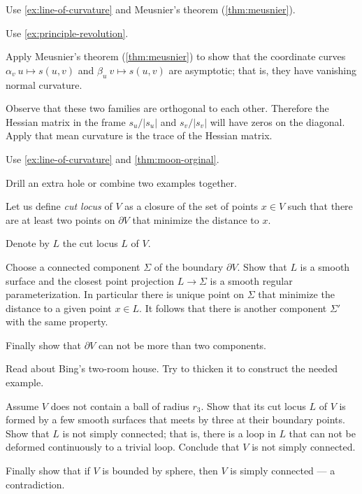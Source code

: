 Use \ref{ex:line-of-curvature} and Meusnier's theorem (\ref{thm:meusnier}).

 Use \ref{ex:principle-revolution}.

 Apply Meusnier's theorem (\ref{thm:meusnier}) to show that the coordinate curves $\alpha_v\:u\mapsto s(u,v)$ and $\beta_u\:v\mapsto s(u,v)$ are asymptotic; that is, they have vanishing normal curvature.

{\sloppy

Observe that these two families are orthogonal to each other.
Therefore the Hessian matrix in the frame $s_u/|s_u|$ and $s_v/|s_v|$ will have zeros on the diagonal.
Apply that mean curvature is the trace of the Hessian matrix.

}

 Use \ref{ex:line-of-curvature} and \ref{thm:moon-orginal}.

 Drill an extra hole or combine two examples together.

Let us define \emph{cut locus} of $V$ as a closure of the set of points $x\in V$ such that there are at least two points on $\partial V$ that minimize the distance to $x$.

Denote by $L$ the cut locus $L$ of $V$.

Choose a connected component $\Sigma$ of the boundary $\partial V$.
Show that $L$ is a smooth surface and the closest point projection $L\to \Sigma$ is a smooth regular parameterization.
In particular there is unique point on $\Sigma$ that minimize the distance to a given point $x\in L$.
It follows that there is another component $\Sigma'$ with the same property.

Finally show that $\partial V$ can not be more than two components.

Read about Bing's two-room house.
Try to thicken it to construct the needed example.

Assume $V$ does not contain a ball of radius $r_3$.
Show that its cut locus $L$ of $V$ is formed by a few smooth surfaces that meets by three at their boundary points.
Show that $L$ is not simply connected; that is, there is a loop in $L$ that can not be deformed continuously to a trivial loop.
Conclude that $V$ is not simply connected.

Finally show that if $V$ is bounded by sphere, then $V$ is simply connected --- a contradiction. 

